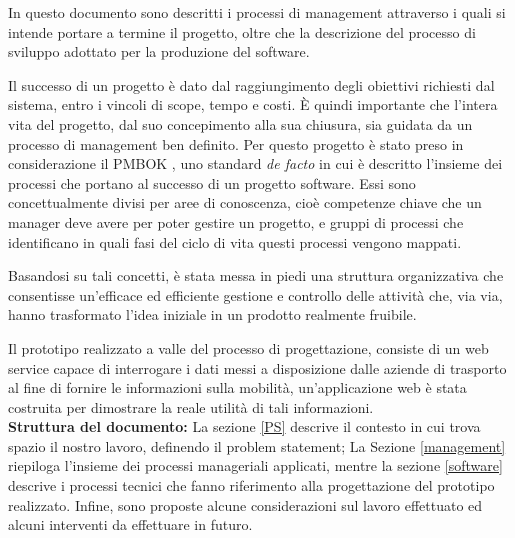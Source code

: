 In questo documento sono descritti i processi di management attraverso i quali si intende portare a termine il progetto, oltre che la descrizione del processo di sviluppo adottato per la produzione del software. 

Il successo di un progetto \`{e} dato dal raggiungimento degli obiettivi richiesti dal sistema, entro i vincoli di scope, tempo e costi. \`{E} quindi importante che l\rq intera vita del progetto, dal suo concepimento alla sua chiusura, sia guidata da un processo di management ben definito. Per questo progetto \`{e} stato preso in considerazione il PMBOK \cite{PMBOK}, uno standard \emph{de facto} in cui \`{e} descritto l\rq insieme dei processi che portano al successo di un progetto software. Essi sono concettualmente divisi per aree di conoscenza, cio\`{e} competenze chiave che un manager deve avere per poter gestire un progetto, e gruppi di processi che identificano in quali fasi del ciclo di vita questi processi vengono mappati.

Basandosi su tali concetti, \`{e} stata messa in piedi una struttura organizzativa che consentisse un\rq efficace ed efficiente gestione e controllo delle attivit\`{a} che, via via, hanno trasformato l\rq idea iniziale in un prodotto realmente fruibile.

Il prototipo realizzato a valle del processo di progettazione, consiste di un web service capace di interrogare i dati messi a disposizione dalle aziende di trasporto al fine di fornire le informazioni sulla mobilit\`{a}, un\rq  applicazione web \`{e} stata costruita per dimostrare la reale utilit\`{a} di tali informazioni.\\

{\bf{Struttura del documento:}} La sezione \ref{PS} descrive il contesto in cui trova spazio il nostro lavoro, definendo il problem statement; La Sezione \ref{management} riepiloga l\rq insieme dei processi manageriali applicati, mentre la sezione \ref{software} descrive i processi tecnici che fanno riferimento alla progettazione del prototipo realizzato. Infine, sono proposte alcune considerazioni sul lavoro effettuato ed alcuni interventi da effettuare in futuro. 